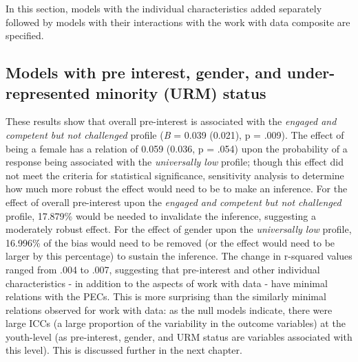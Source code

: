 \documentclass[]{msu-thesis}
\theoremstyle{definition}
\theoremstyle{definition}
\theoremstyle{definition}
\theoremstyle{remark}
\begin{document}
In this section, models with the individual characteristics added
separately followed by models with their interactions with the work with
data composite are specified.

\subsection{Models with pre interest, gender, and under-represented
minority (URM)
status}\label{models-with-pre-interest-gender-and-under-represented-minority-urm-status}

These results show that overall pre-interest is associated with the
\emph{engaged and competent but not challenged} profile (\emph{B} =
0.039 (0.021), p = .009). The effect of being a female has a relation of
0.059 (0.036, p = .054) upon the probability of a response being
associated with the \emph{universally low} profile; though this effect
did not meet the criteria for statistical significance, sensitivity
analysis to determine how much more robust the effect would need to be
to make an inference. For the effect of overall pre-interest upon the
\emph{engaged and competent but not challenged} profile, 17.879\% would
be needed to invalidate the inference, suggesting a moderately robust
effect. For the effect of gender upon the \emph{universally low}
profile, 16.996\% of the bias would need to be removed (or the effect
would need to be larger by this percentage) to sustain the inference.
The change in r-squared values ranged from .004 to .007, suggesting that
pre-interest and other individual characteristics - in addition to the
aspects of work with data - have minimal relations with the PECs. This
is more surprising than the similarly minimal relations observed for
work with data: as the null models indicate, there were large ICCs (a
large proportion of the variability in the outcome variables) at the
youth-level (as pre-interest, gender, and URM status are variables
associated with this level). This is discussed further in the next
chapter.
\end{document}
